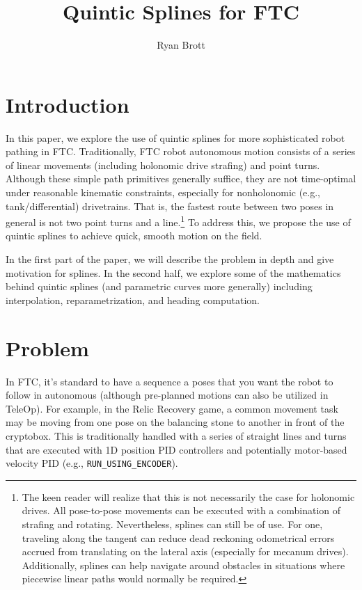\documentclass{article}
\title{Quintic Splines for FTC}
\author{Ryan Brott}
\date{}
\begin{document}
\maketitle

\section{Introduction}
In this paper, we explore the use of quintic splines for more sophisticated robot pathing in FTC. Traditionally, FTC robot autonomous motion consists of a series of linear movements (including holonomic drive strafing) and point turns. Although these simple path primitives generally suffice, they are not time-optimal under reasonable kinematic constraints, especially for nonholonomic (e.g., tank/differential) drivetrains. That is, the fastest route between two poses in general is not two point turns and a line.\footnote{The keen reader will realize that this is not necessarily the case for holonomic drives. All pose-to-pose movements can be executed with a combination of strafing and rotating. Nevertheless, splines can still be of use. For one, traveling along the tangent can reduce dead reckoning odometrical errors accrued from translating on the lateral axis (especially for mecanum drives). Additionally, splines can help navigate around obstacles in situations where piecewise linear paths would normally be required.} To address this, we propose the use of quintic splines to achieve quick, smooth motion on the field.

In the first part of the paper, we will describe the problem in depth and give motivation for splines. In the second half, we explore some of the mathematics behind quintic splines (and parametric curves more generally) including interpolation, reparametrization, and heading computation.

\section{Problem}
In FTC, it's standard to have a sequence a poses that you want the robot to follow in autonomous (although pre-planned motions can also be utilized in TeleOp). For example, in the Relic Recovery game, a common movement task may be moving from one pose on the balancing stone to another in front of the cryptobox. This is traditionally handled with a series of straight lines and turns that are executed with 1D position PID controllers and potentially motor-based velocity PID (e.g., \texttt{RUN\_USING\_ENCODER}).
\end{document}
